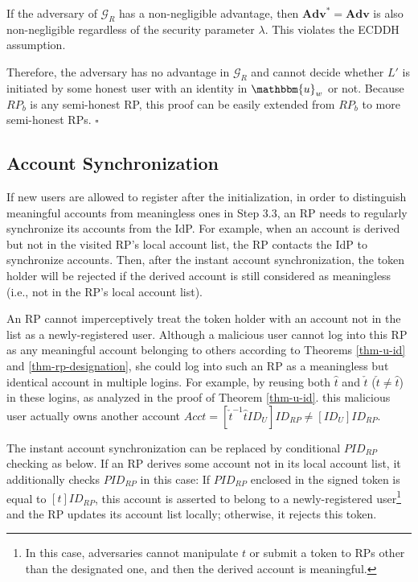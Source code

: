 If the adversary of $\mathcal{G}_R$ has a non-negligible advantage, then $\mathbf{Adv}^*={\mathbf{Adv}}$ is also non-negligible regardless of the security parameter $\lambda$. This violates the ECDDH assumption.

Therefore, the adversary has no advantage in $\mathcal{G}_R$ and cannot decide whether $L'$ is initiated by some honest user with an identity in $\mathbbm{u}_w$ or not.
Because $RP_b$ is any semi-honest RP, this proof can be easily extended from $RP_b$ to more semi-honest RPs.
\hfill $\square$


\subsection{Account Synchronization}
\label{account-syn}
If new users are allowed to register after the initialization,
in order to distinguish meaningful accounts from meaningless ones in Step 3.3,
 an RP needs to regularly synchronize its accounts from the IdP.
For example,
    when an account is derived but not in the visited RP's local account list,
        the RP contacts the IdP to synchronize accounts.
Then, after the instant account synchronization, 
    the token holder will be rejected
     if the derived account is still considered as meaningless (i.e., not in the RP's local account list).

An RP cannot imperceptively treat the token holder with an account not in the list
 as a newly-registered user.
Although a malicious user cannot log into this RP as any meaningful account belonging to others according to Theorems \ref{thm-u-id} and \ref{thm-rp-designation},
 she could log into such an RP as a meaningless but identical account in multiple logins.
For example,
    by reusing both $\hat{t}$ and $\check{t}$ ($\check{t} \neq \hat{t}$) in these logins,
    as analyzed in the proof of Theorem \ref{thm-u-id}.
this malicious user actually owns another account $Acct=[\check{t}^{-1}\hat{t}ID_U]ID_{RP} \neq [ID_U]ID_{RP}$.


The instant account synchronization can be replaced by conditional $PID_{RP}$ checking as below.
If an RP derives some account not in its local account list,
    it additionally checks $PID_{RP}$ in this case:
     If $PID_{RP}$ enclosed in the signed token is equal to $[t]ID_{RP}$,
                this account is asserted to belong to a newly-registered user\footnote{In this case, adversaries cannot manipulate $t$ or submit a token to RPs other than the designated one,
                and then the derived account is meaningful.}
                and the RP updates its account list locally;
    otherwise, it rejects this token.




